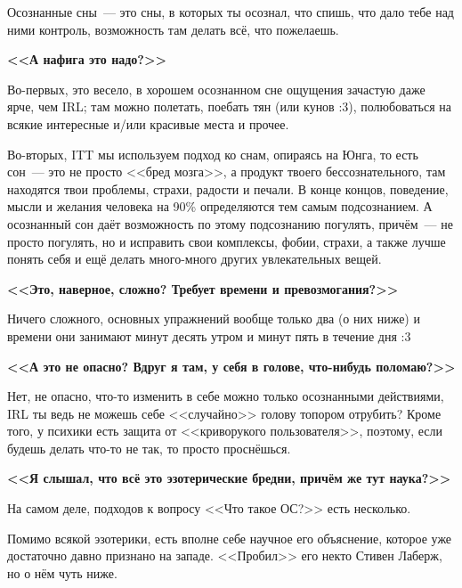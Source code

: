\documentclass[a4paper,14pt,oneside]{memoir}
\begin{document}
Осознанные сны~--- это  сны, в которых ты осознал, что спишь, что дало тебе над ними контроль, возможность там делать всё, что пожелаешь.

\begin{center}
\bfseries{<<А нафига это надо?>>}
\end{center}


Во-первых, это весело, в хорошем осознанном сне ощущения зачастую даже ярче, чем IRL; там можно полетать, поебать тян (или кунов :3), полюбоваться на всякие интересные и/или красивые места и прочее.

Во-вторых, ITT мы используем подход ко снам, опираясь на Юнга, то есть сон~--- это не просто <<бред мозга>>, а продукт твоего бессознательного, там находятся твои проблемы, страхи, радости и печали. В конце концов, поведение, мысли и желания человека на 90\% определяются тем самым подсознанием. А осознанный сон даёт возможность по этому подсознанию погулять, причём~--- не просто погулять, но и исправить свои комплексы, фобии, страхи, а также лучше понять себя и ещё делать много-много других увлекательных вещей. 

\clearpage


\begin{center}
\bfseries{<<Это, наверное, сложно? Требует времени и превозмогания?>>}
\end{center}


Ничего сложного, основных упражнений вообще только два (о них ниже) и времени они занимают минут десять утром и минут пять в течение дня :3 

\begin{center}
\bfseries{<<А это не опасно? Вдруг я там, у себя в голове, что-нибудь поломаю?>>}
\end{center}


Нет, не опасно, что-то изменить в себе можно только осознанными действиями, IRL ты ведь не можешь себе <<случайно>> голову топором отрубить? Кроме того, у психики есть защита от <<криворукого пользователя>>, поэтому, если будешь делать что-то не так, то просто проснёшься. 


\begin{center}
\bfseries{<<Я слышал, что всё это эзотерические бредни, причём же тут наука?>>}
\end{center}


На самом деле, подходов к вопросу <<Что такое ОС?>> есть несколько.
 
Помимо всякой эзотерики, есть вполне себе научное его объяснение, которое уже достаточно давно признано на западе. <<Пробил>> его некто Стивен Лаберж, но о нём чуть ниже.
 
\end{document}
